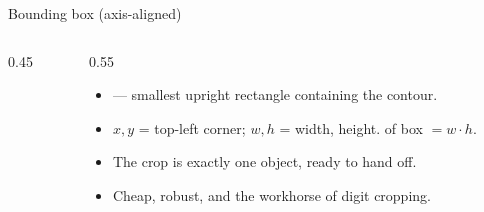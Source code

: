 \documentclass[10pt,aspectratio=169]{beamer}
\begin{document}
\begin{frame}{Bounding box (axis-aligned)}
  \begin{columns}[T]
    \begin{column}{0.45\textwidth}
    \begin{center}
    \end{center}
    \end{column}
    \begin{column}{0.55\textwidth}
      \begin{itemize}\scriptsize
        \item {} — smallest upright rectangle containing the contour.
        \item $x,y$ = top-left corner; $w,h$ = width, height.  of box $=w\cdot h$.
        \item The crop  is exactly one object, ready to hand off.
        \item Cheap, robust, and the workhorse of digit cropping.
      \end{itemize}
    \end{column}
  \end{columns}
\end{frame}
\end{document}
